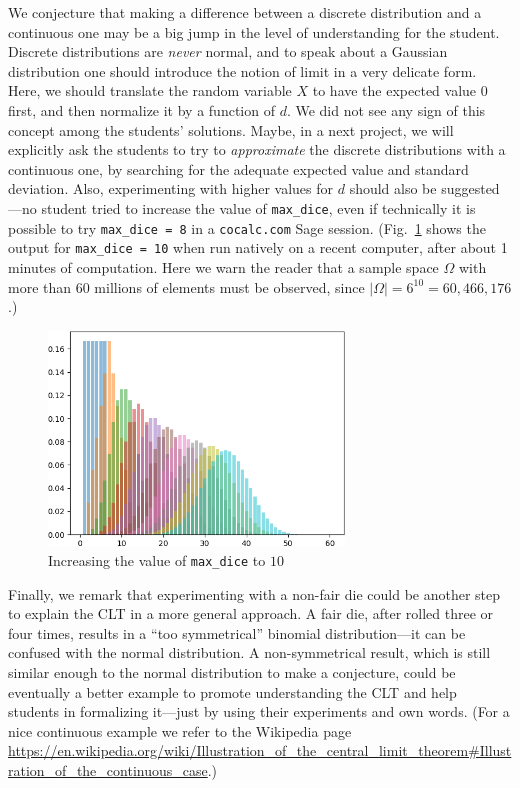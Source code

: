 \documentclass[]{interact}
\theoremstyle{plain}%
\theoremstyle{definition}
\theoremstyle{remark}
\begin{document}
We conjecture that making a difference between a discrete distribution and a continuous one may be
a big jump in the level of understanding for the student. Discrete distributions are \textit{never} normal,
and to speak about a Gaussian distribution one should introduce the notion of limit in a very
delicate form. Here, we should translate the random variable $X$ to have the expected value $0$ first,
and then normalize it by a function of $d$. We did not see any sign of this concept among the
students' solutions. Maybe, in a next project, we will explicitly ask the students to try to
\textit{approximate} the discrete distributions with a continuous one, by searching for the adequate
expected value and standard deviation. Also, experimenting with higher values for $d$ should also be
suggested---no student
tried to increase the value of \texttt{max\_dice}, even if technically it is possible to try
\texttt{max\_dice = 8} in a \texttt{cocalc.com} Sage session. (Fig.~\ref{10} shows the output
for \texttt{max\_dice = 10} when run natively on a recent computer, after about 1 minutes
of computation. Here we warn the reader that a sample space $\Omega$ with more than 60 millions of elements
must be observed, since $|\Omega|=6^{10}=60,466,176$.)

\begin{figure}
\begin{center}
\includegraphics[width=0.7\textwidth]{10}
\caption{Increasing the value of \texttt{max\_dice} to $10$}
\label{10}
\end{center}
\end{figure}

Finally, we remark that experimenting with a non-fair die could be another step to explain
the CLT in a more general approach. A fair die, after rolled three or four times,
results in a ``too symmetrical'' binomial distribution---it can be confused with
the normal distribution. A non-symmetrical result, which is still similar enough
to the normal distribution to make a conjecture, could be eventually a better
example to promote understanding the CLT and help students in formalizing it---just
by using their experiments and own words.
(For a nice continuous example we refer to the Wikipedia page
\url{https://en.wikipedia.org/wiki/Illustration_of_the_central_limit_theorem#Illustration_of_the_continuous_case}.)
\end{document}

